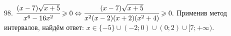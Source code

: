98. $\cfrac{(x-7)\sqrt{x+5}}{x^6-16x^2}\geqslant0\Leftrightarrow
\cfrac{(x-7)\sqrt{x+5}}{x^2(x-2)(x+2)(x^2+4)}\geqslant0.$ Применив метод интервалов, найдём ответ: $x\in\{-5\}\cup(-2;0)\cup(0;2)\cup[7;+\infty).$
\begin{figure}[ht!]
\end{figure}\\
